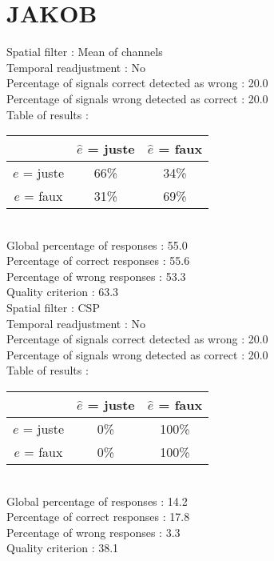 \section*{JAKOB}
Spatial filter : Mean of channels \\
Temporal readjustment : No \\
Percentage of signals correct detected as wrong :   20.0 \\
Percentage of signals wrong detected as correct :   20.0 \\
Table of results : \\
\begin{tabular}{|c|c|c|}
\hline				& $\hat{e}$ = juste & $\hat{e}$ = faux \\
\hline  $e$ = juste	&     66\%			&     34\%		\\
\hline  $e$ = faux	&     31\%			&     69\%		\\
\hline
\end{tabular}\\
Global percentage of responses :   55.0 \\
Percentage of correct responses :   55.6 \\
Percentage of wrong responses :   53.3 \\
Quality criterion :   63.3 \\

Spatial filter : CSP \\
Temporal readjustment : No \\
Percentage of signals correct detected as wrong :   20.0 \\
Percentage of signals wrong detected as correct :   20.0 \\
Table of results : \\
\begin{tabular}{|c|c|c|}
\hline				& $\hat{e}$ = juste & $\hat{e}$ = faux \\
\hline  $e$ = juste	&      0\%			&    100\%		\\
\hline  $e$ = faux	&      0\%			&    100\%		\\
\hline
\end{tabular}\\
Global percentage of responses :   14.2 \\
Percentage of correct responses :   17.8 \\
Percentage of wrong responses :    3.3 \\
Quality criterion :   38.1 \\

